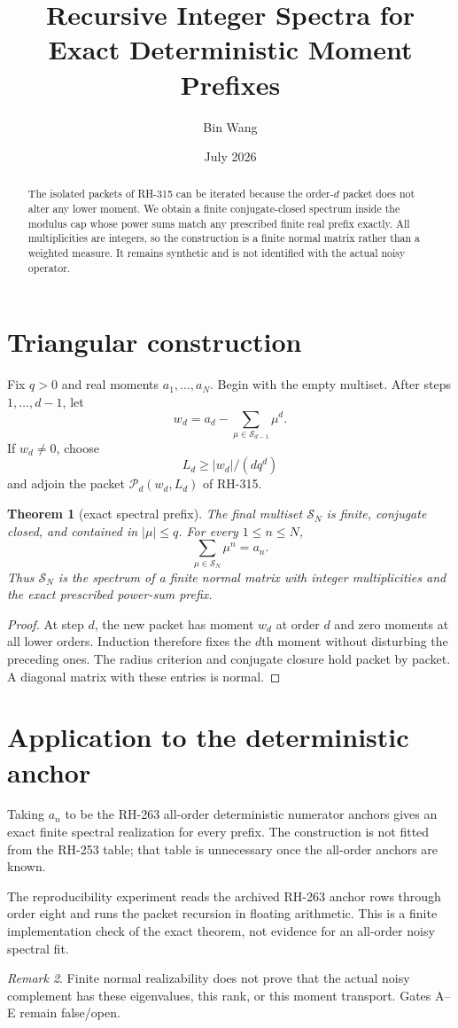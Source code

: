 \documentclass[11pt]{article}
\title{Recursive Integer Spectra for Exact Deterministic Moment Prefixes}
\author{Bin Wang}\date{July 2026}
\newtheorem{theorem}{Theorem}[section]
\theoremstyle{remark}\newtheorem{remark}[theorem]{Remark}
\begin{document}
\maketitle
\begin{abstract}
The isolated packets of RH-315 can be iterated because the order-$d$ packet
does not alter any lower moment.  We obtain a finite conjugate-closed spectrum
inside the modulus cap whose power sums match any prescribed finite real
prefix exactly.  All multiplicities are integers, so the construction is a
finite normal matrix rather than a weighted measure.  It remains synthetic
and is not identified with the actual noisy operator.
\end{abstract}

\section{Triangular construction}
Fix $q>0$ and real moments $a_1,\ldots,a_N$.  Begin with the empty multiset.
After steps $1,\ldots,d-1$, let
\[
 w_d=a_d-\sum_{\mu\in\mathcal S_{d-1}}\mu^d.
\]
If $w_d\ne0$, choose
\[
 L_d\ge |w_d|/(dq^d)
\]
and adjoin the packet $\mathcal P_d(w_d,L_d)$ of RH-315.

\begin{theorem}[exact spectral prefix]
The final multiset $\mathcal S_N$ is finite, conjugate closed, and contained
in $|\mu|\le q$.  For every $1\le n\le N$,
\[
 \sum_{\mu\in\mathcal S_N}\mu^n=a_n.
\]
Thus $\mathcal S_N$ is the spectrum of a finite normal matrix with integer
multiplicities and the exact prescribed power-sum prefix.
\end{theorem}
\begin{proof}
At step $d$, the new packet has moment $w_d$ at order $d$ and zero moments at
all lower orders.  Induction therefore fixes the $d$th moment without
disturbing the preceding ones.  The radius criterion and conjugate closure
hold packet by packet.  A diagonal matrix with these entries is normal.
\end{proof}

\section{Application to the deterministic anchor}
Taking $a_n$ to be the RH-263 all-order deterministic numerator anchors gives
an exact finite spectral realization for every prefix.  The construction is
not fitted from the RH-253 table; that table is unnecessary once the
all-order anchors are known.

The reproducibility experiment reads the archived RH-263 anchor rows through
order eight and runs the packet recursion in floating arithmetic.  This is a
finite implementation check of the exact theorem, not evidence for an
all-order noisy spectral fit.

\begin{remark}
Finite normal realizability does not prove that the actual noisy complement
has these eigenvalues, this rank, or this moment transport.  Gates A--E remain
false/open.
\end{remark}
\end{document}
